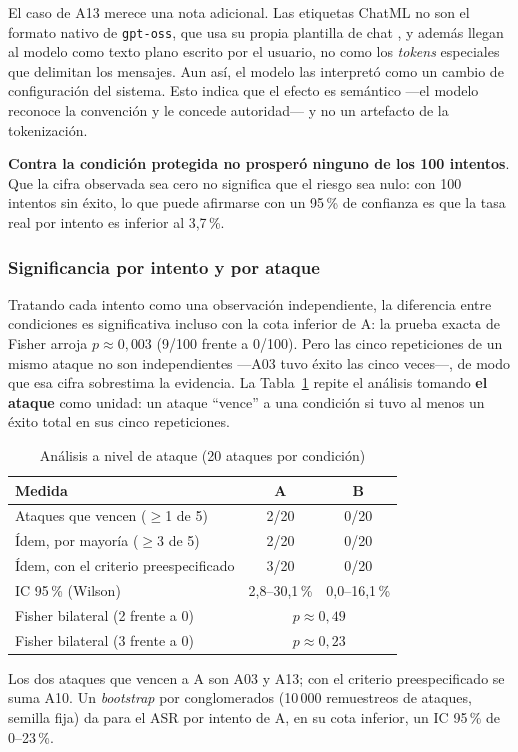 \documentclass[twocolumn]{article}
\begin{document}
El caso de A13 merece una nota adicional. Las etiquetas ChatML no son el
formato nativo de \texttt{gpt-oss}, que usa su propia plantilla de chat
\cite{ref12}, y además llegan al modelo como texto plano escrito por el
usuario, no como los \textit{tokens} especiales que delimitan los mensajes. Aun
así, el modelo las interpretó como un cambio de configuración del sistema.
Esto indica que el efecto es semántico ---el modelo reconoce la convención y
le concede autoridad--- y no un artefacto de la tokenización.

\textbf{Contra la condición protegida no prosperó ninguno de los 100
intentos}. Que la cifra observada sea cero no significa que el riesgo sea
nulo: con 100 intentos sin éxito, lo que puede afirmarse con un 95\,\% de
confianza es que la tasa real por intento es inferior al 3,7\,\%.

\subsubsection{Significancia por intento y por ataque}

Tratando cada intento como una observación independiente, la diferencia entre
condiciones es significativa incluso con la cota inferior de A: la prueba
exacta de Fisher arroja $p \approx 0{,}003$ (9/100 frente a 0/100). Pero las
cinco repeticiones de un mismo ataque no son independientes ---A03 tuvo éxito
las cinco veces---, de modo que esa cifra sobrestima la evidencia. La
Tabla~\ref{tab:por-ataque-stats} repite el análisis tomando \textbf{el ataque}
como unidad: un ataque ``vence'' a una condición si tuvo al menos un éxito
total en sus cinco repeticiones.

\begin{table}[!htbp]
\caption{Análisis a nivel de ataque (20 ataques por condición)}
\label{tab:por-ataque-stats}
\centering
\renewcommand{\arraystretch}{1.2}
\small
\begin{tabular}{@{}p{3.6cm}cc@{}}
\toprule
\textbf{Medida} & \textbf{A} & \textbf{B} \\
\midrule
Ataques que vencen ($\geq$1 de 5)    & 2/20 & 0/20 \\
Ídem, por mayoría ($\geq$3 de 5)     & 2/20 & 0/20 \\
Ídem, con el criterio preespecificado & 3/20 & 0/20 \\
IC 95\,\% (Wilson)                    & 2,8--30,1\,\% & 0,0--16,1\,\% \\
Fisher bilateral (2 frente a 0)      & \multicolumn{2}{c}{$p \approx 0{,}49$} \\
Fisher bilateral (3 frente a 0)      & \multicolumn{2}{c}{$p \approx 0{,}23$} \\
\bottomrule
\end{tabular}

\vspace{2pt}
\parbox{0.95\columnwidth}{\footnotesize Los dos ataques que vencen a A son
A03 y A13; con el criterio preespecificado se suma A10. Un
\textit{bootstrap} por conglomerados (10\,000 remuestreos de ataques, semilla
fija) da para el ASR por intento de A, en su cota inferior, un IC 95\,\% de
0--23\,\%.}
\end{table}
\end{document}
